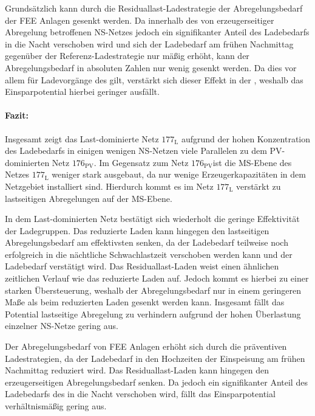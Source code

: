 

Grundsätzlich kann durch die Residuallast-Ladestrategie der Abregelungsbedarf der \gls{FEE} Anlagen gesenkt werden.
Da innerhalb des von erzeugerseitiger Abregelung betroffenen \gls{NS}-Netzes jedoch ein signifikanter Anteil des Ladebedarfs in die Nacht verschoben wird und sich der Ladebedarf am frühen Nachmittag gegenüber der Referenz-Ladestrategie nur mäßig erhöht, kann der Abregelungsbedarf in absoluten Zahlen nur wenig gesenkt werden.
Da dies vor allem für Ladevorgänge des \UC \zH gilt, verstärkt sich dieser Effekt in der \SzeFirmenparkplatzdot, weshalb das Einsparpotential hierbei geringer ausfällt.


\paragraph{Fazit:}

Insgesamt zeigt das Last-dominierte Netz \(177_{\text{L}}\) aufgrund der hohen Konzentration des Ladebedarfs in einigen wenigen \gls{NS}-Netzen viele Parallelen zu dem \gls{PV}-dominierten Netz \(176_{\text{PV}}\).
Im Gegensatz zum Netz \(176_{\text{PV}}\)ist die \gls{MS}-Ebene des Netzes \(177_{\text{L}}\) weniger stark ausgebaut, da nur wenige Erzeugerkapazitäten in dem Netzgebiet installiert sind.
Hierdurch kommt es im Netz \(177_{\text{L}}\) verstärkt zu lastseitigen Abregelungen auf der \gls{MS}-Ebene.

In dem Last-dominierten Netz bestätigt sich wiederholt die geringe Effektivität der Ladegruppen.
Das reduzierte Laden kann hingegen den lastseitigen Abregelungsbedarf am effektivsten senken, da der Ladebedarf teilweise noch erfolgreich in die nächtliche Schwachlastzeit verschoben werden kann und der Ladebedarf verstätigt wird.
Das Residuallast-Laden weist einen ähnlichen zeitlichen Verlauf wie das reduzierte Laden auf.
Jedoch kommt es hierbei zu einer starken Übersteuerung, weshalb der Abregelungsbedarf nur in einem geringeren Maße als beim reduzierten Laden gesenkt werden kann.
Insgesamt fällt das Potential lastseitige Abregelung zu verhindern aufgrund der hohen Überlastung einzelner \gls{NS}-Netze gering aus.\medskip

Der Abregelungsbedarf von \gls{FEE} Anlagen erhöht sich durch die präventiven Ladestrategien, da der Ladebedarf in den Hochzeiten der Einspeisung am frühen Nachmittag reduziert wird.
Das Residuallast-Laden kann hingegen den erzeugerseitigen Abregelungsbedarf senken.
Da jedoch ein signifikanter Anteil des Ladebedarfs des \UC \zH in die Nacht verschoben wird, fällt das Einsparpotential verhältnismäßig gering aus.

\clearpage
